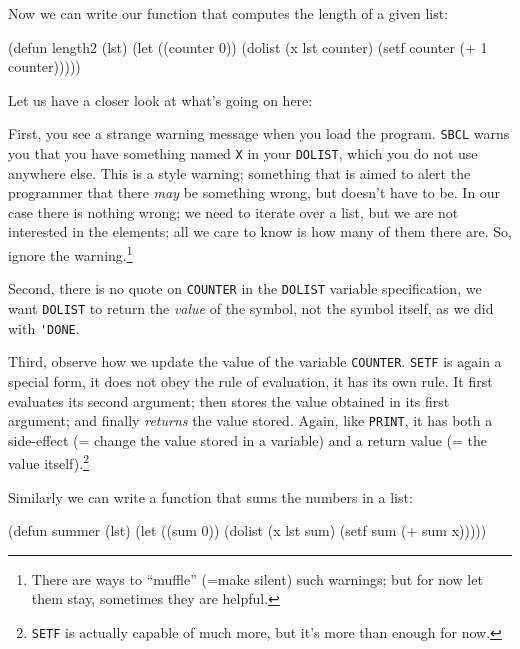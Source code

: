 \documentclass[a4paper,11pt]{article}
\begin{document}
\begin{uenum}
\begin{uenumi}
\end{uenumi}

\item Now we can write our function that computes the length of a given list:

\begin{lispcode}
(defun length2 (lst)
  (let ((counter 0))
	(dolist (x lst counter)
	  (setf counter (+ 1 counter)))))
\end{lispcode}

Let us have a closer look at what's going on here:

\begin{uenumi}

\item First, you see a strange warning message when you load the program. \Verb+SBCL+ warns you that you have something named \Verb+X+ in your \Verb+DOLIST+, which you do not use anywhere else. This is a style warning; something that is aimed to alert the programmer that there \emph{may} be something wrong, but doesn't have to be. In our case there is nothing wrong; we need to iterate over a list, but we are not interested in the elements; all we care to know is how many of them there are. So, ignore the warning.\footnote{There are ways to ``muffle'' (=make silent) such warnings; but for now let them stay, sometimes they are helpful.}

\item Second, there is no quote on \Verb+COUNTER+ in the \Verb+DOLIST+ variable specification, we want \Verb+DOLIST+ to return the \emph{value} of the symbol, not the symbol itself, as we did with \Verb+'DONE+.

\item Third, observe how we update the value of the variable \Verb+COUNTER+. \Verb+SETF+ is again a special form, it does not obey the rule of evaluation, it has its own rule. It first evaluates its second argument; then stores the value obtained in its first argument; and finally \emph{returns} the value stored. Again, like \Verb+PRINT+, it has both a side-effect (= change the value stored in a variable) and a return value (= the value itself).\footnote{\Verb+SETF+ is actually capable of much more, but it's more than enough for now.}
\end{uenumi}


\item Similarly we can write a function that sums the numbers in a list:

\begin{lispcode}
(defun summer (lst)
  (let ((sum 0))
	(dolist (x lst sum)
	  (setf sum (+ sum x)))))
\end{lispcode}


\end{uenum}
\end{document}
